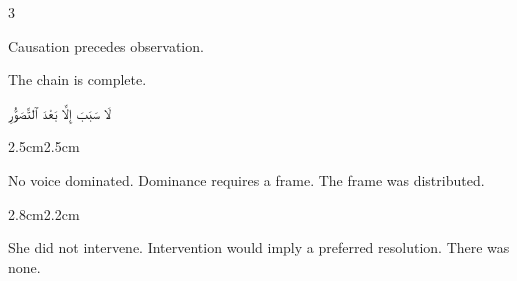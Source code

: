 \begin{paracol}{3}

\switchcolumn

Causation precedes observation.

\medskip


\vspace{2em}

The chain is complete.

\switchcolumn


\vspace{2em}

\begin{AR}
لَا سَبَبَ إِلَّا بَعْدَ ٱلتَّصَوُّرِ
\end{AR}

\switchcolumn*


\medskip


\medskip


\end{paracol}

\vspace{3em}

\begin{adjustwidth}{2.5cm}{2.5cm}

No voice dominated. Dominance requires a frame. The frame was distributed.

\vspace{3em}

\end{adjustwidth}

\begin{center}
\end{center}

\vspace{2em}

\begin{center}
\end{center}

\vspace{3em}

\begin{adjustwidth}{2.8cm}{2.2cm}

She did not intervene. Intervention would imply a preferred resolution. There
was none.

\vspace{3em}

\end{adjustwidth}

